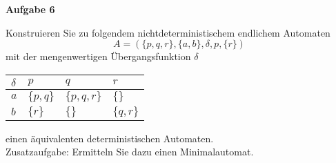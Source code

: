 \documentclass[a4paper,12pt]{article}
\newcommand{\Aufgabe}[1]{
	{
		\vspace*{0.5cm}
		\textsf{\textbf{Aufgabe #1}}
		\vspace*{0.2cm}
		
	}
}
\begin{document}
	\Aufgabe{6}
	Konstruieren Sie zu folgendem nichtdeterministischem endlichem Automaten
	$$A=(\{p,q,r\}, \{a,b\}, \delta, p, \{r\})$$
	mit der mengenwertigen Übergangsfunktion $\delta$
	\begin{center}
		\begin{tabular}{|l|l|l|l|}
			\hline
			$\delta$ & $p$ & $q$ & $r$ \\
			\hline
			$a$ & $\{p,q\}$ & $\{p,q,r\}$ & $\{\}$ \\
			\hline
			$b$ & $\{r\}$ & $\{\}$ & $\{q,r\}$ \\
			\hline
		\end{tabular}
	\end{center}
	einen äquivalenten deterministischen Automaten.\\
	Zusatzaufgabe: Ermitteln Sie dazu einen Minimalautomat. 
\end{document}
